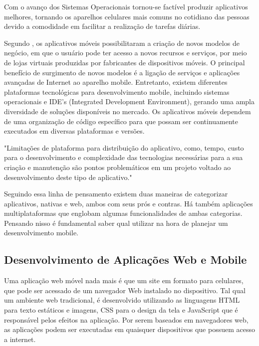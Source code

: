 Com o avanço dos Sistemas Operacionais tornou-se factível produzir aplicativos melhores, tornando os aparelhos celulares mais comuns no cotidiano das pessoas devido a comodidade em facilitar a realização de tarefas diárias.

Segundo , os aplicativos móveis possibilitaram a criação de novos modelos de negócio, em que o usuário pode ter acesso a novos recursos e serviços, por meio de lojas virtuais produzidas por fabricantes de dispositivos móveis. O principal benefício de surgimento de novos modelos é a ligação de serviços e aplicações avançadas de Internet ao aparelho mobile. Entretanto, existem diferentes plataformas tecnológicas para desenvolvimento mobile, incluindo sistemas operacionais e IDE's  (Integrated Development Environment), gerando uma ampla diversidade de soluções disponíveis no mercado. Os aplicativos móveis dependem de uma organização de código específico para que possam ser continuamente executados em diversas plataformas e versões.

\begin{citacao}
	"Limitações de plataforma para distribuição do aplicativo, como, tempo, custo para o desenvolvimento e complexidade das tecnologias necessárias para a sua criação e manutenção são pontos problemáticos em um projeto voltado ao desenvolvimento deste tipo de aplicativo."\cite{emdesafios}
\end{citacao}

Seguindo essa linha de pensamento existem duas maneiras de categorizar
aplicativos, nativas e web, ambos com seus prós e contras. Há também aplicações multiplataformas que englobam algumas funcionalidades de ambas categorias. Pensando nisso é fundamental saber qual utilizar na hora de planejar um desenvolvimento mobile.

\subsection{Desenvolvimento de Aplicações Web e Mobile}

Uma aplicação web móvel nada mais é que um site em formato para celulares, que pode ser acessado de um navegador Web instalado no dispositivo. Tal qual um ambiente web tradicional, é desenvolvido utilizando as linguagens HTML para texto estáticos e imagens, CSS para o design da tela e JavaScript que é responsável pelos efeitos na aplicação. Por serem baseados em navegadores web, as aplicações podem ser executadas em quaisquer dispositivos que possuem acesso a internet.\cite{emdesafios}

